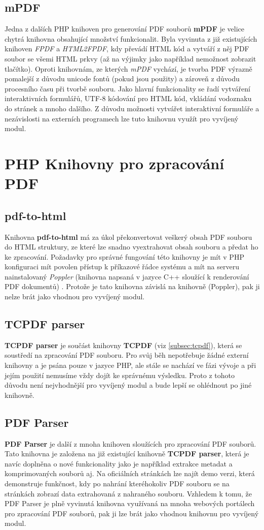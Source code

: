\subsection{mPDF}
Jedna z dalších PHP knihoven pro generování PDF souborů \textbf{mPDF} je velice chytrá knihovna obsahující množství funkcionalit. Byla vyvinuta z již existujících knihoven \textit{FPDF} a \textit{HTML2FPDF}, kdy převádí HTML kód a vytváří z něj PDF soubor se všemi HTML prkvy (až na výjimky jako například nemožnost zobrazit tlačítko). Oproti knihovnám, ze kterých \textit{mPDF} vychází, je tvorba PDF výrazně pomalejší z důvodu unicode fontů (pokud jsou použity) a zároveň z důvodu procesního času při tvorbě souboru. Jako hlavní funkcionality se řadí vytváření interaktivních formulářů, UTF-8 kódování pro HTML kód, vkládání vodoznaku do stránek a mnoho dalšího. Z důvodu možnosti vytvářet interaktivní formuláře a nezávislosti na externích programech lze tuto knihovnu využít pro vyvíjený modul.
\section{PHP Knihovny pro zpracování PDF}
\subsection{pdf-to-html}
Knihovna \textbf{pdf-to-html} má za úkol překonvertovat veškerý obsah PDF souboru do HTML struktury, ze které lze snadno vyextrahovat obsah souboru a předat ho ke zpracování. Požadavky pro správné fungování této knihovny je mít v PHP konfiguraci mít povolen přístup k příkazové řádce systému a mít na serveru nainstalovaný \textit{Poppler} (knihovna napsaná v jazyce C++ sloužící k renderování PDF dokumentů) \cite{pdfToHtml}. Protože je tato knihovna závislá na knihovně (Poppler), pak ji nelze brát jako vhodnou pro vyvíjený modul. 
\subsection{TCPDF parser}
\textbf{TCPDF parser} je součást knihovny \textbf{TCPDF} (viz \ref{subsec:tcpdf}), která se soustředí na zpracování PDF souboru. Pro svůj běh nepotřebuje žádné externí knihovny a je psána pouze v jazyce PHP, ale stále se nachází ve fázi vývoje a při jejím použití nemusíme vždy dojít ke správnému výsledku. Proto z tohoto důvodu není nejvhodnější pro vyvíjený modul a bude lepší se ohlédnout po jiné knihovně.
\subsection{PDF Parser}
\textbf{PDF Parser} je další z mnoha knihoven sloužících pro zpracování PDF souborů. Tato knihovna je založena na již existující knihovně \textbf{TCPDF parser}, která je navíc doplněna o nové funkcionality jako je například extrakce metadat a komprimovaných souborů aj. Na oficiálních stránkách lze najít demo verzi, která demonstruje funkčnost, kdy po nahrání kteréhokoliv PDF souboru se na stránkách zobrazí data extrahovaná z nahraného souboru. Vzhledem k tomu, že PDF Parser je plně vyvinutá knihovna využívaná na mnoha webových portálech pro zpracování PDF souborů, pak ji lze brát jako vhodnou knihovnu pro vyvíjený modul.

